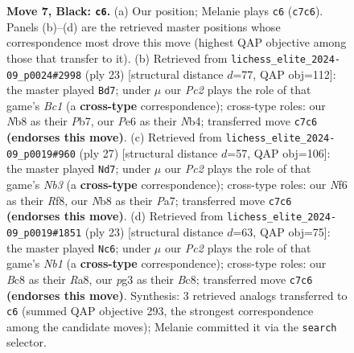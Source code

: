 \documentclass[11pt]{article}
\begin{document}
\begin{figure}[p]
\caption{\textbf{Move 7, Black: \texttt{c6}.} (a) Our position; Melanie plays \texttt{c6} (\texttt{c7c6}). Panels (b)--(d) are the retrieved master positions whose correspondence most drove this move (highest QAP objective among those that transfer to it). (b) Retrieved from \texttt{lichess\_elite\_2024-09\_p0024\#2998} (ply 23) [structural distance $d$=77, QAP obj=112]: the master played \texttt{Bd7}; under $\mu$ our \emph{Pc2} plays the role of that game's \emph{Bc1} (a \textbf{cross-type} correspondence); cross-type roles: our \emph{N}b8 as their \emph{P}b7, our \emph{P}e6 as their \emph{N}b4; transferred move \texttt{c7c6} \textbf{(endorses this move)}. (c) Retrieved from \texttt{lichess\_elite\_2024-09\_p0019\#960} (ply 27) [structural distance $d$=57, QAP obj=106]: the master played \texttt{Nd7}; under $\mu$ our \emph{Pc2} plays the role of that game's \emph{Nb3} (a \textbf{cross-type} correspondence); cross-type roles: our \emph{N}f6 as their \emph{R}f8, our \emph{N}b8 as their \emph{P}a7; transferred move \texttt{c7c6} \textbf{(endorses this move)}. (d) Retrieved from \texttt{lichess\_elite\_2024-09\_p0019\#1851} (ply 23) [structural distance $d$=63, QAP obj=75]: the master played \texttt{Nc6}; under $\mu$ our \emph{Pc2} plays the role of that game's \emph{Nb1} (a \textbf{cross-type} correspondence); cross-type roles: our \emph{B}c8 as their \emph{R}a8, our \emph{p}g3 as their \emph{B}c8; transferred move \texttt{c7c6} \textbf{(endorses this move)}. Synthesis: 3 retrieved analogs transferred to \texttt{c6} (summed QAP objective 293, the strongest correspondence among the candidate moves); Melanie committed it via the \texttt{search} selector.}
\label{fig:thought-m13}
\end{figure}

\clearpage
\end{document}
